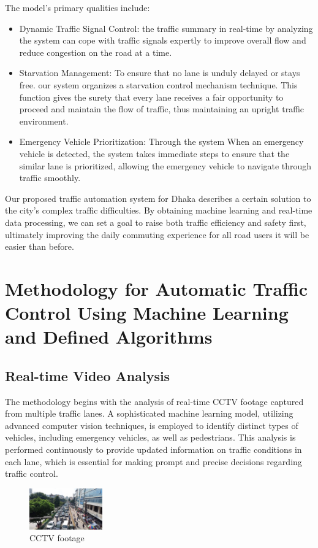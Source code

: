 \documentclass[usenatbib]{tjaa}
\begin{document}
The model's primary qualities include: 
\begin{itemize}
    \item Dynamic Traffic Signal Control: the traffic summary in real-time by analyzing the system can cope with traffic signals expertly to improve overall flow and reduce congestion on the road at a time.
    \item Starvation Management: To ensure that no lane is unduly delayed or stays free. our system organizes a starvation control mechanism technique. This function gives the surety that every lane receives a fair opportunity to proceed and maintain the flow of traffic, thus maintaining an upright traffic environment. 
    \item Emergency Vehicle Prioritization: Through the system When an emergency vehicle is detected, the system takes immediate steps to ensure that the similar lane is prioritized, allowing the emergency vehicle to navigate through traffic smoothly. 
\end{itemize}

 

Our proposed traffic automation system for Dhaka describes a certain solution to the city's complex traffic difficulties. By obtaining machine learning and real-time data processing, we can set a goal to raise both traffic efficiency and safety first, ultimately improving the daily commuting experience for all road users it will be easier than before.


\section[]{Methodology for Automatic Traffic Control Using Machine Learning and Defined Algorithms}

\subsection{Real-time Video Analysis}
The methodology begins with the analysis of real-time CCTV footage captured from multiple traffic lanes. A sophisticated machine learning model, utilizing advanced computer vision techniques, is employed to identify distinct types of vehicles, including emergency vehicles, as well as pedestrians. This analysis is performed continuously to provide updated information on traffic conditions in each lane, which is essential for making prompt and precise decisions regarding traffic control.

\begin{figure}
    \centering
    \includegraphics[width=0.28\textwidth]{7.jpg}
    \caption{CCTV footage} %
    \label{fig:wrapped} %
\end{figure}
\end{document}
